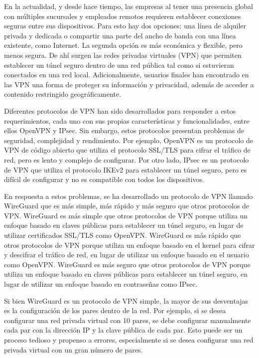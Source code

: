 En la actualidad, y desde hace tiempo, las empresas al tener una presencia global con múltiples sucursales y empleados remotos requieren establecer conexiones seguras entre sus dispositivos. Para esto hay dos opciones: una línea de alquiler privada y dedicada o compartir una parte del ancho de banda con una línea existente, como Internet. La segunda opción es más económica y flexible, pero menos segura. De ahí surgen las redes privadas virtuales (VPN) que permiten establecer un túnel seguro dentro de una red pública tal como si estuvieran conectados en una red local. Adicionalmente, usuarios finales han encontrado en las VPN una forma de proteger su información y privacidad, además de acceder a contenido restringido geográficamente.

Diferentes protocolos de VPN han sido desarrollados para responder a estos requerimientos, cada uno con sus propias características y funcionalidades, entre ellos OpenVPN y IPsec. Sin embargo, estos protocolos presentan problemas de seguridad, complejidad y rendimiento. Por ejemplo, OpenVPN es un protocolo de VPN de código abierto que utiliza el protocolo SSL/TLS para cifrar el tráfico de red, pero es lento y complejo de configurar. Por otro lado, IPsec es un protocolo de VPN que utiliza el protocolo IKEv2 para establecer un túnel seguro, pero es difícil de configurar y no es compatible con todos los dispositivos.

En respuesta a estos problemas, se ha desarrollado un protocolo de VPN llamado WireGuard que es más simple, más rápido y más seguro que otros protocolos de VPN. WireGuard es más simple que otros protocolos de VPN porque utiliza un enfoque basado en claves públicas para establecer un túnel seguro, en lugar de utilizar certificados SSL/TLS como OpenVPN. WireGuard es más rápido que otros protocolos de VPN porque utiliza un enfoque basado en el kernel para cifrar y descifrar el tráfico de red, en lugar de utilizar un enfoque basado en el usuario como OpenVPN. WireGuard es más seguro que otros protocolos de VPN porque utiliza un enfoque basado en claves públicas para establecer un túnel seguro, en lugar de utilizar un enfoque basado en contraseñas como IPsec.

Si bien WireGuard es un protocolo de VPN simple, la mayor de sus desventajas es la configuración de los pares dentro de la red. Por ejemplo, si se desea configurar una red privada virtual con 10 pares, se debe configurar manualmente cada par con la dirección IP y la clave pública de cada par. Esto puede ser un proceso tedioso y propenso a errores, especialmente si se desea configurar una red privada virtual con un gran número de pares.

